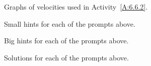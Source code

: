 \begin{marginfigure}[-6cm]
\begin{center}
\end{center}
\caption{Graphs of velocities used in Activity~\ref{A:6.6.2}.}
\end{marginfigure}


\begin{smallhint}
\ba
	\item Small hints for each of the prompts above.
\ea
\end{smallhint}
\begin{bighint}
\ba
	\item Big hints for each of the prompts above.
\ea
\end{bighint}
\begin{activitySolution}
\ba
	\item Solutions for each of the prompts above.
\ea
\end{activitySolution}
\aftera